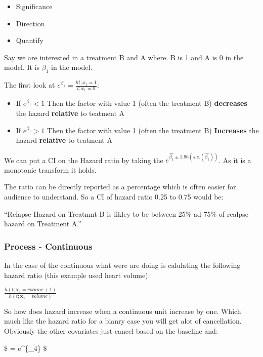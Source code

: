 \documentclass[
  letterpaper,
  DIV=11,
  numbers=noendperiod]{scrreprt}
\providecommand{\tightlist}{%
  \setlength{\itemsep}{0pt}\setlength{\parskip}{0pt}}\usepackage{longtable,booktabs,array}
\begin{document}
\begin{itemize}
\tightlist
\item
  Significance
\item
  Direction
\item
  Quantify
\end{itemize}

Say we are interested in a treatment B and A where. B is 1 and A is 0 in
the model. It is \(\beta_1\) in the model.

The first look at \(e^{\beta_1} = \frac{h{t;x_1=1}}{t;x_1=0}\):

\begin{itemize}
\tightlist
\item
  If \(e^{\beta_1} <1\) Then the factor with value 1 (often the
  treatment B) \textbf{decreases} the hazard \textbf{relative} to
  teatment A
\item
  If \(e^{\beta_1} >1\) Then the factor with value 1 (often the
  treatment B) \textbf{Increases} the hazard \textbf{relative} to
  teatment A
\end{itemize}

We can put a CI on the Hazard ratio by taking the
\(e^{\hat{\beta_1} \pm 1.96(s.e.(\hat{\beta_1}))}\). As it is a
monotonic transform it holds.

The ratio can be directly reported as a percentage which is often easier
for audience to understand. So a CI of hazard ratio 0.25 to 0.75 would
be:

``Relapse Hazard on Treatmnt B is likley to be between 25\% ad 75\% of
realpse hazard on Treatment A.''

\hypertarget{process---continuous}{%
\subsubsection{Process - Continuous}\label{process---continuous}}

In the case of the continuous what were are doing is calulating the
following hazard ratio (this example used heart volume):

\(\frac{h(t; \textbf{x}_4 = volume + 1)}{h(t; \textbf{x}_4 = volume)}\)

So how does hazard increase when a continuous unit increase by one.
Which much like the hazard ratio for a bianry case you will get alot of
cancellation. Obviously the other covariates just cancel based on the
baseline and:

\$ = e\^{}\{\beta\_4\} \$
\end{document}
